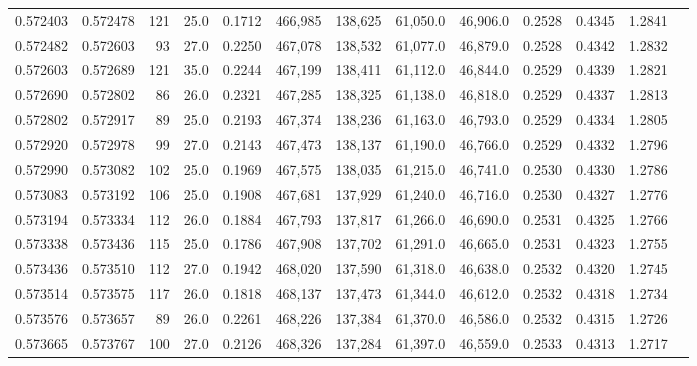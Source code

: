 \begin{tabular}{rrrrrrrrrrrrr}
0.572403 & 0.572478 &   121 & 25.0 &                                     0.1712 & 466,985 & 138,625 &  61,050.0 &  46,906.0 & 0.2528 & 0.4345 & 1.2841 \\
0.572482 & 0.572603 &    93 & 27.0 &                                     0.2250 & 467,078 & 138,532 &  61,077.0 &  46,879.0 & 0.2528 & 0.4342 & 1.2832 \\
0.572603 & 0.572689 &   121 & 35.0 &                                     0.2244 & 467,199 & 138,411 &  61,112.0 &  46,844.0 & 0.2529 & 0.4339 & 1.2821 \\
0.572690 & 0.572802 &    86 & 26.0 &                                     0.2321 & 467,285 & 138,325 &  61,138.0 &  46,818.0 & 0.2529 & 0.4337 & 1.2813 \\
0.572802 & 0.572917 &    89 & 25.0 &                                     0.2193 & 467,374 & 138,236 &  61,163.0 &  46,793.0 & 0.2529 & 0.4334 & 1.2805 \\
0.572920 & 0.572978 &    99 & 27.0 &                                     0.2143 & 467,473 & 138,137 &  61,190.0 &  46,766.0 & 0.2529 & 0.4332 & 1.2796 \\
0.572990 & 0.573082 &   102 & 25.0 &                                     0.1969 & 467,575 & 138,035 &  61,215.0 &  46,741.0 & 0.2530 & 0.4330 & 1.2786 \\
0.573083 & 0.573192 &   106 & 25.0 &                                     0.1908 & 467,681 & 137,929 &  61,240.0 &  46,716.0 & 0.2530 & 0.4327 & 1.2776 \\
0.573194 & 0.573334 &   112 & 26.0 &                                     0.1884 & 467,793 & 137,817 &  61,266.0 &  46,690.0 & 0.2531 & 0.4325 & 1.2766 \\
0.573338 & 0.573436 &   115 & 25.0 &                                     0.1786 & 467,908 & 137,702 &  61,291.0 &  46,665.0 & 0.2531 & 0.4323 & 1.2755 \\
0.573436 & 0.573510 &   112 & 27.0 &                                     0.1942 & 468,020 & 137,590 &  61,318.0 &  46,638.0 & 0.2532 & 0.4320 & 1.2745 \\
0.573514 & 0.573575 &   117 & 26.0 &                                     0.1818 & 468,137 & 137,473 &  61,344.0 &  46,612.0 & 0.2532 & 0.4318 & 1.2734 \\
0.573576 & 0.573657 &    89 & 26.0 &                                     0.2261 & 468,226 & 137,384 &  61,370.0 &  46,586.0 & 0.2532 & 0.4315 & 1.2726 \\
0.573665 & 0.573767 &   100 & 27.0 &                                     0.2126 & 468,326 & 137,284 &  61,397.0 &  46,559.0 & 0.2533 & 0.4313 & 1.2717 \\

\end{tabular}
